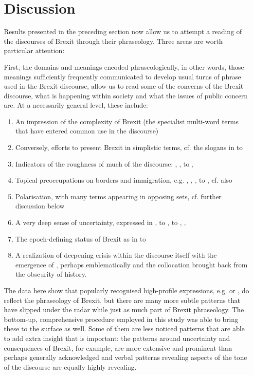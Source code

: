 \documentclass[output=paper]{langscibook}
\begin{document}
\section{Discussion}

Results presented in the preceding section now allow us to attempt a reading of the discourses of Brexit through their phraseology. Three areas are worth particular attention:

First, the domains and meanings encoded phraseologically, in other words, those meanings sufficiently frequently communicated to develop usual turns of phrase used in the Brexit discourse, allow us to read some of the concerns of the Brexit discourse, what is happening within society and what the issues of public concern are. At a necessarily general level, these include: 

\begin{enumerate}
\item An impression of the complexity of Brexit (the specialist multi-word terms that have entered common use in the discourse)
\item Conversely, efforts to present Brexit in simplistic terms, cf. the slogans in  to 
\item Indicators of the roughness of much of the discourse: , ,  to , 
\item Topical preoccupations on borders and immigration, e.g. , , ,  to , cf. also \citet{Mair2019}
\item Polarisation, with many terms appearing in opposing sets, cf. further discussion below
\item A very deep sense of uncertainty, expressed in ,  to ,  to , , 
\item The epoch-defining status of Brexit as in  to 
\item A realization of deepening crisis within the discourse itself with the emergence of , perhaps emblematically  and the collocation  brought back from the obscurity of history.
\end{enumerate}

The data here show that popularly recognised high-profile expressions, e.g.  or , do reflect the phraseology of Brexit, but there are many more subtle patterns that have slipped under the radar while just as much part of Brexit phraseology. The bottom-up, comprehensive procedure employed in this study was able to bring these to the surface as well. Some of them are less noticed patterns that are able to add extra insight that is important: the patterns around uncertainty and consequences of Brexit, for example, are more extensive and prominent than perhaps generally acknowledged and verbal patterns revealing aspects of the tone of the discourse are equally highly revealing.
\end{document}
